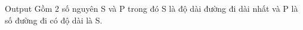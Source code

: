 Output
Gồm 2 số nguyên S và P trong đó S là độ dài đường đi dài nhất và P là số đường đi có độ dài là S.